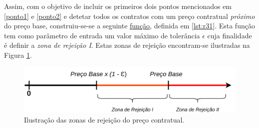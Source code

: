 \begin{table}[H]
	\centering
	\renewcommand{\arraystretch}{1.15}
	\setlength{\tabcolsep}{15pt}
	\caption{Exemplo de um contrato adjudicado por lotes.}
\label{tab:lotes}
\end{table}






Assim, com o objetivo de incluir os primeiros dois pontos mencionados em \ref{ponto1} e \ref{ponto2} e detetar todos os contratos com um preço contratual \textit{próximo} do preço base, construiu-se-se a seguinte \hyperref[lst:r31]{função}, definida em \ref{lst:r31}. Esta função tem como parâmetro de entrada um valor máximo de tolerância $\epsilon$ cuja finalidade é definir a \textit{zona de rejeição I}. Estas zonas de rejeição encontram-se ilustradas na Figura \ref{fig:rej}.

\begin{figure}[H]
	\centering
	\includegraphics[width=.8\textwidth]{imagens/r31/r31.png}
	\caption{Ilustração das zonas de rejeição do preço contratual. }
	\label{fig:rej}
\end{figure}

